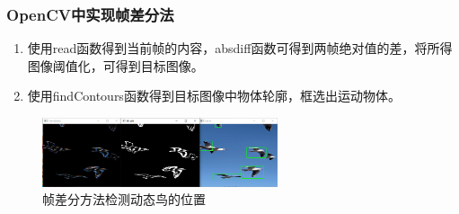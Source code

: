 \begin{frame}
    \frametitle{OpenCV中实现帧差分法}

    \begin{enumerate}
        \item 使用read函数得到当前帧的内容，absdiff函数可得到两帧绝对值的差，将所得图像阈值化，可得到目标图像。
        \item 使用findContours函数得到目标图像中物体轮廓，框选出运动物体。
    \end{enumerate}

    \begin{figure}
        \centering
        \includegraphics[width=0.618\textwidth]{images/frame_diff_bird.png}
        \caption{帧差分方法检测动态鸟的位置}
    \end{figure}

\end{frame}